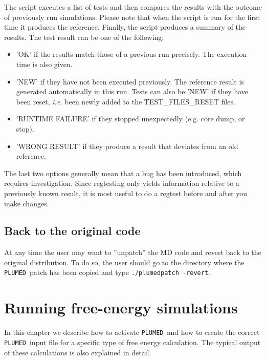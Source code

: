 \documentclass[12pt,fleqn]{report}
\newcommand{\plumed}{{\tt PLUMED}}
\begin{document}
The script executes a list of tests and then compares the results
with the outcome of previously run simulations.
Please note that when the script is run for the 
first time it produces the reference. Finally, the script produces a summary of the results.
The test result can be one of the following:
\begin{itemize}
\item 'OK' if the results match those of a previous run precisely. The execution time is also given.
\item'NEW' if they have not been executed previously. The reference result is generated
      automatically in this run. Tests can also be 'NEW' if they have been reset, \emph{i.e.} been newly
      added to the TEST\_FILES\_RESET files.
\item 'RUNTIME FAILURE' if they stopped unexpectedly (e.g. core dump, or stop).
\item 'WRONG RESULT' if they produce a result that deviates from an old reference.
\end{itemize}
  
  The last two options generally mean that a bug has been introduced, which requires investigation.
  Since regtesting only yields information relative to a previously known result, it is most useful
  to do a regtest before and after you make changes.

\section{Back to the original code}

At any time the user may want to ''unpatch'' the MD code and revert back to
the original distribution. 
To do so, the user should go to the directory where the \plumed \ patch has been copied and type {\tt ./plumedpatch -revert}.  




\chapter{Running free-energy simulations}
\label{ch.running}
\label{ch.input}

In this chapter we describe how to activate \plumed \
and how to create the correct \plumed  \ input file for a specific type of free energy calculation.
The typical output of these calculations is also explained in detail.
\end{document}
